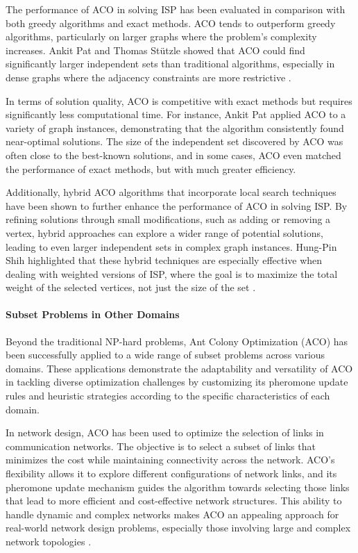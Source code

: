 The performance of ACO in solving ISP has been evaluated in comparison with both greedy algorithms and exact methods. ACO tends to outperform greedy algorithms, particularly on larger graphs where the problem's complexity increases. Ankit Pat and Thomas Stützle showed that ACO could find significantly larger independent sets than traditional algorithms, especially in dense graphs where the adjacency constraints are more restrictive \cite{Pat2014,Stutzle2011}.

In terms of solution quality, ACO is competitive with exact methods but requires significantly less computational time. For instance, Ankit Pat applied ACO to a variety of graph instances, demonstrating that the algorithm consistently found near-optimal solutions\cite{Pat2014}. The size of the independent set discovered by ACO was often close to the best-known solutions, and in some cases, ACO even matched the performance of exact methods, but with much greater efficiency.

Additionally, hybrid ACO algorithms that incorporate local search techniques have been shown to further enhance the performance of ACO in solving ISP. By refining solutions through small modifications, such as adding or removing a vertex, hybrid approaches can explore a wider range of potential solutions, leading to even larger independent sets in complex graph instances. Hung-Pin Shih highlighted that these hybrid techniques are especially effective when dealing with weighted versions of ISP, where the goal is to maximize the total weight of the selected vertices, not just the size of the set \cite{Shih2008}.

\paragraph{Subset Problems in Other Domains}
Beyond the traditional NP-hard problems, Ant Colony Optimization (ACO) has been successfully applied to a wide range of subset problems across various domains. These applications demonstrate the adaptability and versatility of ACO in tackling diverse optimization challenges by customizing its pheromone update rules and heuristic strategies according to the specific characteristics of each domain.

In network design, ACO has been used to optimize the selection of links in communication networks. The objective is to select a subset of links that minimizes the cost while maintaining connectivity across the network. ACO's flexibility allows it to explore different configurations of network links, and its pheromone update mechanism guides the algorithm towards selecting those links that lead to more efficient and cost-effective network structures. This ability to handle dynamic and complex networks makes ACO an appealing approach for real-world network design problems, especially those involving large and complex network topologies \cite{Dorigo2004}.

